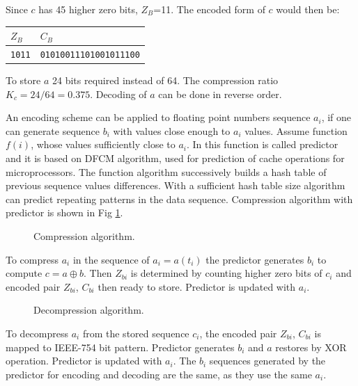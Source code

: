 \documentclass[lettersize,journal]{IEEEtran}
\begin{document}
Since \(c\) has 45 higher zero bits, \(Z_B\)=11. The encoded form of \(c\) would then be:

\begin{table}[!h]
	\centering
	\fontsize{5.5}{1.2} {
		\begin{tabularx}{0.4\columnwidth}{ 
				| >{\raggedright\arraybackslash}l 
				| >{\raggedright\arraybackslash}X |}
			\hline
			\multicolumn{1}{|c|} {\(Z_B\)} & \multicolumn{1}{c|} {\(C_B\)} \\ 
			\hline
			\texttt{1011} & \texttt{01010011101001011100} \\
			\hline
		\end{tabularx}
	}
\end{table}

To store \(a\) 24 bits required instead of 64. The compression ratio \(K_c=24/64=0.375\). 
Decoding of \(a\) can be done in reverse order.

An encoding scheme can be applied to floating point numbers sequence \(a_i\), if one can generate sequence \(b_i\)
with values close enough to \(a_i\) values. Assume function \(f(i)\), whose values sufficiently close to \(a_i\).
In \cite{ratana06} this function is called predictor and it is based on DFCM algorithm, used for prediction of cache operations for microprocessors. The function algorithm successively builds a hash table of previous sequence values differences. 
With a sufficient hash table size algorithm can predict repeating patterns in the data sequence. Compression
algorithm with predictor is shown in Fig \ref{fig_compr}.

\begin{figure}[h]
	\centering
	\caption{Compression algorithm.}
	\label{fig_compr}
\end{figure}

To compress \(a_i\) in the sequence of \(a_i=a(t_i)\) the predictor generates \(b_i\) to compute 
\(c=a \oplus b \). 
Then \(Z_{bi}\) is determined by counting higher zero bits of \(c_i\) and encoded pair \(Z_{bi}\), \(C_{bi}\) then ready to store.
Predictor is updated with \(a_i\).

\begin{figure}[h]
	\centering
	\caption{Decompression algorithm.}
	\label{fig_decompr}
\end{figure}

To decompress \(a_i\) from the stored sequence \(c_i\), the encoded pair \(Z_{bi}\), \(C_{bi}\) 
is mapped to IEEE-754 bit pattern. Predictor generates \(b_i\) and \(a\) restores by XOR operation.
Predictor is updated with \(a_i\). The \(b_i\) sequences generated by the predictor for encoding and decoding are the same, as they use the same \(a_i\).
\end{document}
